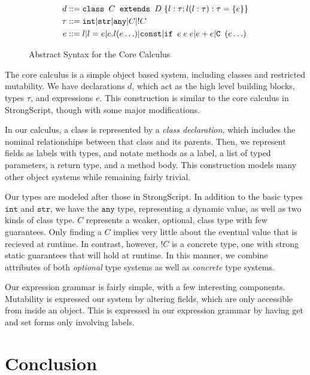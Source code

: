 \documentclass{llncs}
\newcommand{\class}[4]{\ensuremath\texttt{class } #1 \texttt{ extends } #2 \;\{#3; #4\}}
\newcommand{\field}[2]{\ensuremath #1 : #2}
\newcommand{\method}[4]{\ensuremath #1(#2):#3 = \{#4\}}
\newcommand{\ifabs}[3]{\texttt{if } #1\;#2\;#3}
\newcommand{\opplus}[2]{#1 + #2}
\newcommand{\newclass}[2]{\texttt{#1 }(#2)}
\newcommand{\strt}{\texttt{str}}
\newcommand{\intt}{\texttt{int}}
\newcommand{\anyt}{\texttt{any}}
\begin{document}
\begin{figure}
\begin{align*}
d&::= \class{C}{D}{\field{l}{\tau}}{\method{l}{\field{l}{\tau}}{\tau}{e}}\\
\tau &::= \intt | \strt | \anyt | C | !C\\
e&::= l | l = e | e.l(e \ldots) | \texttt{const} | \ifabs{e}{e}{e} | \opplus{e}{e} | \newclass{C}{e\ldots}
\end{align*}

\caption{Abstract Syntax for the Core Calculus}
\end{figure}

The core calculus is a simple object based system, including classes and 
restricted mutability. We have declarations $d$, which act as the high level 
building blocks, types $\tau$, and expressions $e$. This construction is similar
to the core calculus in StrongScript, though with some major modifications.

In our calculus, a class is represented by a \emph{class declaration}, which includes
the nominal relationships between that class and its parents. Then, we represent fields
as labels with types, and notate methods as a label, a list of typed parameters, a return type,
and a method body. This construction models many other object systems while remaining fairly trivial.

Our types are modeled after those in StrongScript. In addition to the basic types $\intt$ and
$\strt$, we have the $\anyt$ type, representing a dynamic value, as well as two kinds of class type.
$C$ represents a weaker, optional, class type with few guarantees. Only finding a $C$ implies very
little about the eventual value that is recieved at runtime. In contrast, however, $!C$ is a concrete type,
one with strong static guarantees that will hold at runtime. In this manner, we combine attributes of both
\emph{optional} type systems as well as \emph{concrete} type systems.

Our expression grammar is fairly simple, with a few interesting components. Mutability is expressed our
system by altering fields, which are only accessible from inside an object. This is expressed in our expression
grammar by having get and set forms only involving labels. 

\section{Conclusion}




\end{document}
